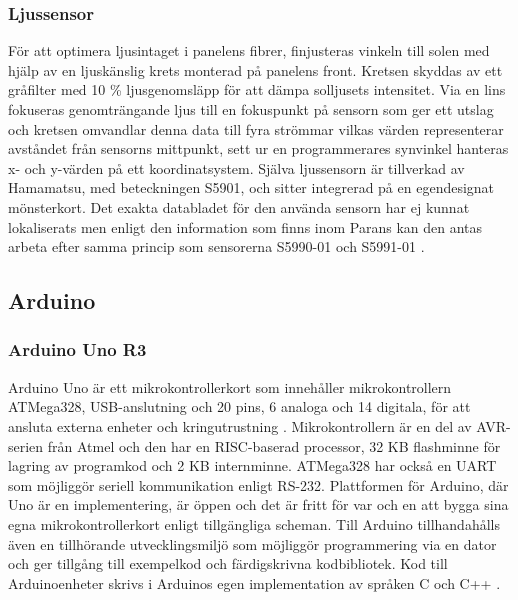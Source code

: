         \subsubsection{Ljussensor} %
        \label{ssub:ljussensor}
            För att optimera ljusintaget i panelens fibrer, finjusteras vinkeln till solen med hjälp av en ljuskänslig krets monterad på panelens front. Kretsen skyddas av ett gråfilter med 10 \% ljusgenomsläpp för att dämpa solljusets intensitet. Via en lins fokuseras genomträngande ljus till en fokuspunkt på sensorn som ger ett utslag och kretsen omvandlar denna data till fyra strömmar vilkas värden representerar avståndet från sensorns mittpunkt, sett ur en programmerares synvinkel hanteras x- och y-värden på ett koordinatsystem. Själva ljussensorn är tillverkad av Hamamatsu, med beteckningen S5901, och sitter integrerad på en egendesignat mönsterkort. Det exakta databladet för den använda sensorn har ej kunnat lokaliserats men enligt den information som finns inom Parans kan den antas arbeta efter samma princip som sensorerna S5990-01 och S5991-01 \cite{hama}.

    \subsection{Arduino} %
        \subsubsection{Arduino Uno R3} %
        \label{ssub:arduino_uno}
            Arduino Uno är ett mikrokontrollerkort som innehåller mikrokontrollern ATMega328, USB-anslutning och 20 pins, 6 analoga och 14 digitala, för att ansluta externa enheter och kringutrustning \cite[kap.~1]{ard_internals}. Mikrokontrollern är en del av AVR-serien från Atmel och den har en RISC-baserad processor, 32 KB flashminne för lagring av programkod och 2 KB internminne. ATMega328 har också en UART som möjliggör seriell kommunikation enligt RS-232. Plattformen för Arduino, där Uno är en implementering, är öppen och det är fritt för var och en att bygga sina egna mikrokontrollerkort enligt tillgängliga scheman. Till Arduino tillhandahålls även en tillhörande utvecklingsmiljö som möjliggör programmering via en dator och ger tillgång till exempelkod och färdigskrivna kodbibliotek. Kod till Arduinoenheter skrivs i Arduinos egen implementation av språken C och C++ \cites[kap.~2]{ard_c}{ard_cplusplus}.

